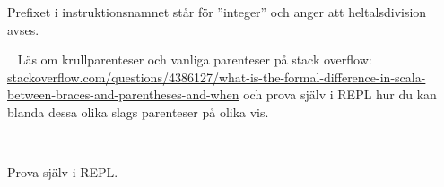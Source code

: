 \SubtaskSolved Prefixet  i instruktionsnamnet  står för ''integer'' och anger att heltalsdivision avses.

\QUESTEND





\QUESTBEGIN

\Task  \what~ Läs om krullparenteser och vanliga parenteser på stack overflow: \\ \href{http://stackoverflow.com/questions/4386127/what-is-the-formal-difference-in-scala-between-braces-and-parentheses-and-when}{stackoverflow.com/questions/4386127/what-is-the-formal-difference-in-scala-between-braces-and-parentheses-and-when} och prova själv i REPL hur du kan blanda dessa olika slags parenteser på olika vis.

\SOLUTION

\TaskSolved \what~

\SubtaskSolved Prova själv i REPL.

\QUESTEND
